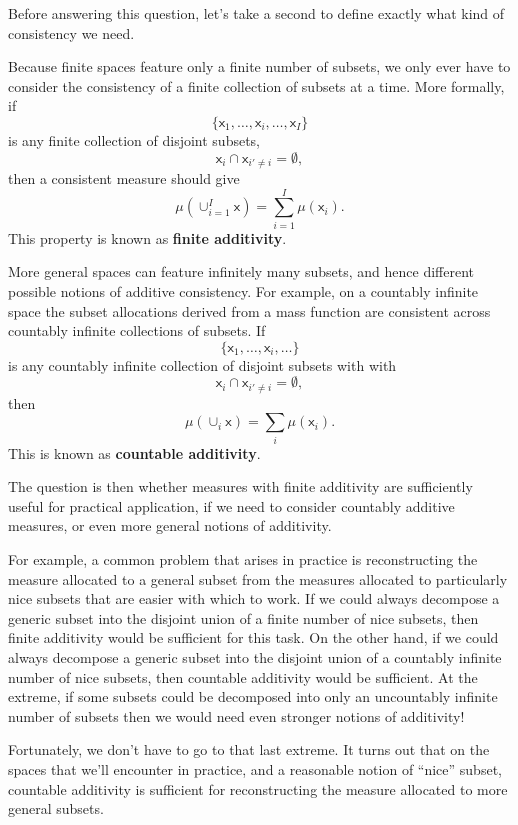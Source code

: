 \documentclass[
  letterpaper,
  DIV=11,
  numbers=noendperiod]{scrartcl}
\begin{document}
Before answering this question, let's take a second to define exactly
what kind of consistency we need.

Because finite spaces feature only a finite number of subsets, we only
ever have to consider the consistency of a finite collection of subsets
at a time. More formally, if \[
\{
  \mathsf{x}_{1}, \ldots, \mathsf{x}_{i}, \ldots, \mathsf{x}_{I}
\}
\] is any finite collection of disjoint subsets, \[
\mathsf{x}_{i} \cap \mathsf{x}_{i' \ne i} = \emptyset,
\] then a consistent measure should give \[
\mu( \cup_{i = 1}^{I} \mathsf{x} )
=
\sum_{i = 1}^{I} \mu( \mathsf{x}_{i}).
\] This property is known as \textbf{finite additivity}.

More general spaces can feature infinitely many subsets, and hence
different possible notions of additive consistency. For example, on a
countably infinite space the subset allocations derived from a mass
function are consistent across countably infinite collections of
subsets. If \[
\{ \mathsf{x}_{1}, \ldots, \mathsf{x}_{i}, \ldots \}
\] is any countably infinite collection of disjoint subsets with with \[
\mathsf{x}_{i} \cap \mathsf{x}_{i' \ne i} = \emptyset,
\] then \[
\mu( \cup_{i} \mathsf{x} )
=
\sum_{i} \mu( \mathsf{x}_{i}).
\] This is known as \textbf{countable additivity}.

The question is then whether measures with finite additivity are
sufficiently useful for practical application, if we need to consider
countably additive measures, or even more general notions of additivity.

For example, a common problem that arises in practice is reconstructing
the measure allocated to a general subset from the measures allocated to
particularly nice subsets that are easier with which to work. If we
could always decompose a generic subset into the disjoint union of a
finite number of nice subsets, then finite additivity would be
sufficient for this task. On the other hand, if we could always
decompose a generic subset into the disjoint union of a countably
infinite number of nice subsets, then countable additivity would be
sufficient. At the extreme, if some subsets could be decomposed into
only an uncountably infinite number of subsets then we would need even
stronger notions of additivity!

Fortunately, we don't have to go to that last extreme. It turns out that
on the spaces that we'll encounter in practice, and a reasonable notion
of ``nice'' subset, countable additivity is sufficient for
reconstructing the measure allocated to more general subsets.
\end{document}
